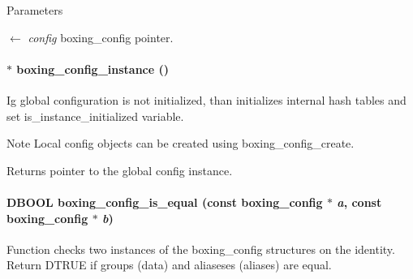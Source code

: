 \begin{DoxyParams}{Parameters}
\item[\mbox{$\leftarrow$} {\em config}]boxing\_\-config pointer. \end{DoxyParams}
\hypertarget{group__config_ga0290a2c16c8bc625819803b0ce1ef7de}{
\paragraph[{boxing\_\-config\_\-instance}]{$\ast$ boxing\_\-config\_\-instance ()}\hfill}
\label{group__config_ga0290a2c16c8bc625819803b0ce1ef7de}
Ig global configuration is not initialized, than initializes internal hash tables and set is\_\-instance\_\-initialized variable.

\begin{DoxyNote}{Note}
Local config objects can be created using boxing\_\-config\_\-create. 
\end{DoxyNote}
\begin{DoxyReturn}{Returns}
pointer to the global config instance. 
\end{DoxyReturn}
\hypertarget{group__config_ga4497166dc4bd1fac380e2cc448a0c4c9}{
\paragraph[{boxing\_\-config\_\-is\_\-equal}]{\setlength{\rightskip}{0pt plus 5cm}DBOOL boxing\_\-config\_\-is\_\-equal (const {\bf boxing\_\-config} $\ast$ {\em a}, \/  const {\bf boxing\_\-config} $\ast$ {\em b})}\hfill}
\label{group__config_ga4497166dc4bd1fac380e2cc448a0c4c9}
Function checks two instances of the boxing\_\-config structures on the identity. Return DTRUE if groups (data) and aliaseses (aliases) are equal.


